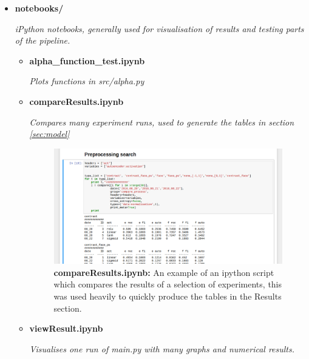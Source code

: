 {\begin{itemize}
\begin{itemize}
                \end{itemize}
        \item   {\bf notebooks/ }
                \begin{sloppypar} \textit{iPython notebooks, generally used for visualisation of results and testing parts of the pipeline.}\end{sloppypar}
                \begin{itemize}
                  \item {\bf alpha\_function\_test.ipynb }
                  \begin{sloppypar} \textit{Plots functions in src/alpha.py}\end{sloppypar}
                  \item {\bf compareResults.ipynb }
                  \begin{sloppypar} \textit{Compares many experiment runs, used to generate the tables in section \ref{sec:model}}\end{sloppypar}
                    \begin{figure}[!h]
                    \centering
                    \includegraphics[width =0.8\hsize]{figures/notebook2.png}
                    \caption{{\bf compareResults.ipynb: }An example of an ipython script which compares the results of a selection of experiments,
                    this was used heavily to quickly produce the tables in the Results section.}
                    \label{fig:compareresults}
                    \end{figure}
                  \item {\bf viewResult.ipynb }
                  \begin{sloppypar} \textit{Visualises one run of main.py with many graphs and numerical results.}\end{sloppypar}
                    \begin{figure}[!h]
                    \centering

\end{figure}
\end{itemize}
\end{itemize}}
